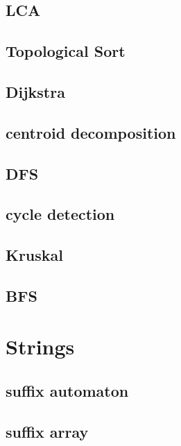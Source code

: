 \subsection{LCA}
\raggedbottom
\hrulefill
\subsection{Topological Sort}
\raggedbottom
\hrulefill
\subsection{Dijkstra}
\raggedbottom
\hrulefill
\subsection{centroid decomposition}
\raggedbottom
\hrulefill
\subsection{DFS}
\raggedbottom
\hrulefill
\subsection{cycle detection}
\raggedbottom
\hrulefill
\subsection{Kruskal}
\raggedbottom
\hrulefill
\subsection{BFS}
\raggedbottom
\hrulefill

\section{Strings}
\subsection{suffix automaton}
\raggedbottom
\hrulefill
\subsection{suffix array}
\raggedbottom
\hrulefill
